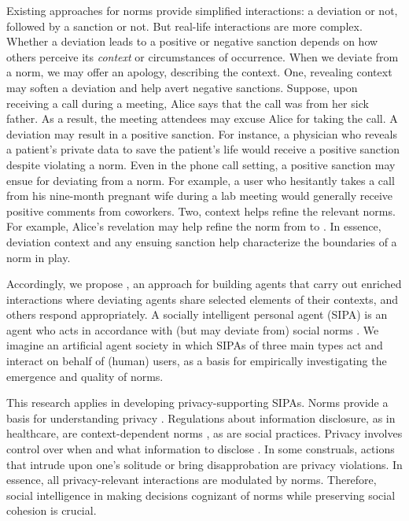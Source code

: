 Existing approaches for norms provide simplified interactions: a deviation or not, followed by a sanction or not. But real-life interactions are more complex. Whether a deviation leads to a positive or negative sanction depends on 
how others perceive its \emph{context} or circumstances of occurrence. 
When we deviate from a norm, we may offer an apology, describing the 
context. One, revealing context may soften a deviation and help avert 
negative sanctions. Suppose, upon receiving a call during a meeting, 
Alice says that the call was from her sick father. As a result, the meeting attendees may excuse Alice for taking 
the call. A deviation may result in a positive sanction. For instance, 
a physician who reveals a patient's private data to save the patient's life 
would receive a positive sanction despite violating a norm. 
Even in the phone call setting, a positive sanction may ensue for deviating from a norm. For
example, a user who hesitantly takes a call from his nine-month
pregnant wife during a lab meeting would generally receive positive
comments from coworkers.
%
Two, context helps refine the relevant norms. For example, Alice's 
revelation may help refine the norm from  to . In essence, deviation context and any ensuing 
sanction help characterize the boundaries of a norm in play.

Accordingly, we propose \frameworkB, an approach for building agents that carry out enriched interactions where deviating agents share selected elements of their contexts, and others respond appropriately. A socially intelligent personal agent (SIPA) is an agent who acts in accordance with (but may deviate from) social norms \citep{Ajmeri-AAMAS17-Arnor}.  
%
We imagine an artificial agent society in which SIPAs of three main types act and interact on behalf of (human) users, as a basis for empirically investigating the emergence and quality of norms. 

This research applies in developing privacy-supporting SIPAs. Norms provide a basis for understanding privacy \citep{Nissenbaum-11:online}. Regulations about information disclosure, as in healthcare, are context-dependent norms \citep{Ajmeri-IJCAI16-Coco}, as are social practices. Privacy involves control over when and what information to disclose \citep{westin1967privacy}. In some construals, actions that intrude upon one's solitude or bring disapprobation are privacy violations. In essence, all privacy-relevant interactions are modulated by norms.  Therefore, social intelligence in making decisions cognizant of norms while preserving social cohesion is crucial.

